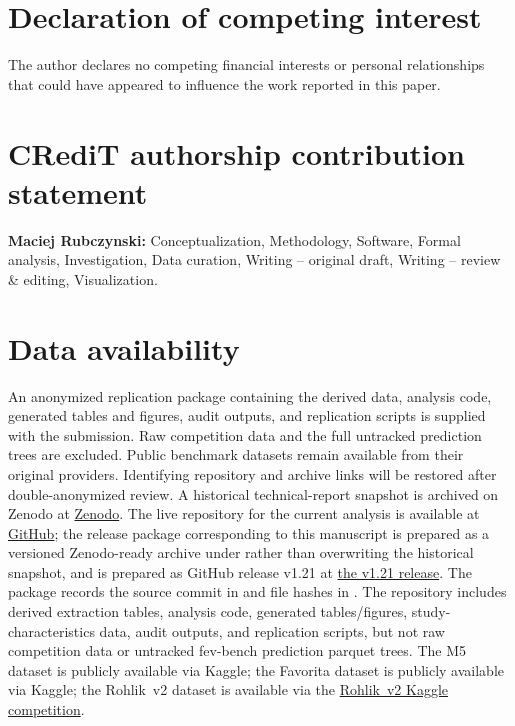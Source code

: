 \documentclass[preprint,12pt,authoryear]{elsarticle}
\begin{document}
\section*{Declaration of competing interest}
The author declares no competing financial interests or personal
relationships that could have appeared to influence the work
reported in this paper.

\ifdefined\anonymoussubmission
\else
\section*{CRediT authorship contribution statement}
\textbf{Maciej Rubczynski:} Conceptualization, Methodology, Software,
Formal analysis, Investigation, Data curation, Writing -- original
draft, Writing -- review \& editing, Visualization.
\fi

\section*{Data availability}
\ifdefined\anonymoussubmission
An anonymized replication package containing the derived data, analysis code,
generated tables and figures, audit outputs, and replication scripts is
supplied with the submission.  Raw competition data and the full untracked
prediction trees are excluded.  Public benchmark datasets remain available
from their original providers.  Identifying repository and archive links will
be restored after double-anonymized review.
\else
A historical technical-report snapshot is archived on Zenodo at
\href{https://doi.org/10.5281/zenodo.21338004}{Zenodo}.
The live repository for the current analysis is available at
\href{https://github.com/MaciejR/large-scale-demand-forecasting-benchmark}{GitHub};
the release package corresponding to this manuscript is prepared as a
versioned Zenodo-ready archive under  rather than overwriting the
historical snapshot, and is prepared as GitHub release v1.21 at
\href{https://github.com/MaciejR/large-scale-demand-forecasting-benchmark/releases/tag/v1.21}{the v1.21 release}.
The package records the source commit in
 and file hashes in .
The repository includes derived extraction tables, analysis code, generated
tables/figures, study-characteristics data, audit outputs, and replication
scripts, but not raw competition data or untracked fev-bench prediction
parquet trees.
The M5 dataset is publicly available via Kaggle; the Favorita
dataset is publicly available via Kaggle; the Rohlik~v2 dataset
is available via the
\href{https://www.kaggle.com/competitions/rohlik-sales-forecasting-challenge-v2}{Rohlik~v2 Kaggle competition}.
\fi
\end{document}
